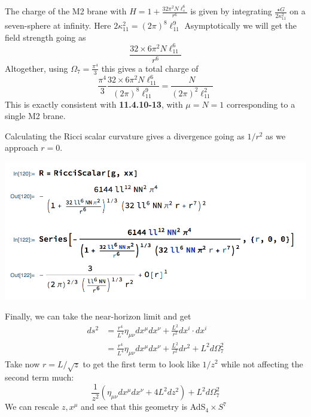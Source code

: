 \documentclass[11pt, class=article, crop=false]{standalone}
\begin{document}
\begin{enumerate}
	The charge of the M2 brane with $H = 1 + \frac{32 \pi^2 N \ell_s^6}{r^6}$ is given by integrating $\frac{\star G}{2\kappa_{11}^2}$ on a seven-sphere at infinity. Here $2 \kappa_{11}^2 = (2\pi)^8 \ell_{11}^9$ Asymptotically we will get the field strength going as
	\[
		\frac{32 \times 6 \pi^2 N \ell_{11}^6}{r^6}
	\]
	Altogether, using $\Omega_7 = \frac{\pi^4}{3}$ this gives a total charge of
	\[
		\frac{\pi^4}{3} \frac{32 \times 6 \pi^2 N \ell_{11}^6}{(2\pi)^8 \ell_{11}^9} = \frac{N}{(2\pi)^2 \ell_{11}^2}
	\]
	This is exactly consistent with \textbf{11.4.10-13}, with $\mu = N = 1$ corresponding to a single M2 brane. 
	
	Calculating the Ricci scalar curvature gives a divergence going as $1/r^2$ as we approach $r = 0$. 
	\begin{center}
		\includegraphics[scale=0.5]{"Figures/M2 Ricci"}
	\end{center}
	Finally, we can take the near-horizon limit and get
	\[
	\begin{aligned}
		ds^2 &= \frac{r^4}{L^4} \eta_{\mu \nu} dx^\mu dx^\nu + \frac{L^2}{r^2} dx^i \cdot dx^i\\
		 &= \frac{r^4}{L^4} \eta_{\mu \nu} dx^\mu dx^\nu + \frac{L^2}{r^2} dr^2  + L^2 d \Omega_7^2
	\end{aligned}
	\]
	Take now $r = L/\sqrt{z}$ to get the first term to look like $1/z^2$ while not affecting the second term much:
	\[
		\frac{1}{z^2} (\eta_{\mu \nu} dx^\mu dx^\nu + 4 L^2 dz^2) + L^2 d \Omega_7^2
	\]
	We can rescale $z, x^\mu$ and see that  this geometry is AdS$_4 \times S^7$ 
	

\end{enumerate}
\end{document}
